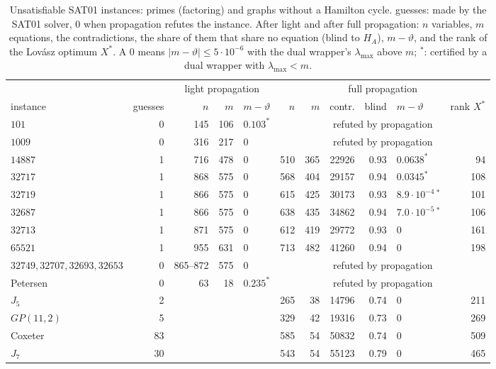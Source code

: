 \documentclass[11pt]{article}
\theoremstyle{definition}
\theoremstyle{remark}
\newcommand{\lmax}{\lambda_{\max}}
\begin{document}
\begin{table}[ht]
\begin{center}
\small
\setlength\tabcolsep{3pt}
\begin{tabular}{|l|r|r|r|l|r|r|r|r|l|r|}
\hline
 & & \multicolumn{3}{c|}{light propagation} & \multicolumn{6}{c|}{full propagation} \\
instance & guesses & $n$ & $m$ & $m-\vartheta$ & $n$ & $m$ & contr. & blind & $m-\vartheta$ & rank $X^*$ \\
\hline
$101$   & 0 & 145 & 106 & $0.103^*$ & \multicolumn{6}{c|}{refuted by propagation} \\
$1009$  & 0 & 316 & 217 & 0 & \multicolumn{6}{c|}{refuted by propagation} \\
$14887$ & 1 & 716 & 478 & 0 & 510 & 365 & 22926 & 0.93 & $0.0638^*$ & 94 \\
$32717$ & 1 & 868 & 575 & 0 & 568 & 404 & 29157 & 0.94 & $0.0345^*$ & 108 \\
$32719$ & 1 & 866 & 575 & 0 & 615 & 425 & 30173 & 0.93 & $8.9\cdot10^{-4}\,{}^*$ & 101 \\
$32687$ & 1 & 866 & 575 & 0 & 638 & 435 & 34862 & 0.94 & $7.0\cdot10^{-5}\,{}^*$ & 106 \\
$32713$ & 1 & 871 & 575 & 0 & 612 & 419 & 29772 & 0.93 & 0 & 161 \\
$65521$ & 1 & 955 & 631 & 0 & 713 & 482 & 41260 & 0.94 & 0 & 198 \\
$32749,32707,32693,32653$ & 0 & 865--872 & 575 & 0 & \multicolumn{6}{c|}{refuted by propagation} \\
\hline
Petersen   & 0  & 63 & 18 & $0.235^*$ & \multicolumn{6}{c|}{refuted by propagation} \\
$J_5$      & 2  &    &    &   & 265 & 38 & 14796 & 0.74 & 0 & 211 \\
$GP(11,2)$ & 5  &    &    &   & 329 & 42 & 19316 & 0.73 & 0 & 269 \\
Coxeter    & 83 &    &    &   & 585 & 54 & 50832 & 0.74 & 0 & 509 \\
$J_7$      & 30 &    &    &   & 543 & 54 & 55123 & 0.79 & 0 & 465 \\
\hline
\end{tabular}
\end{center}
\caption{\label{tab:sat01unsat} Unsatisfiable SAT01 instances: primes
(factoring) and graphs without a Hamilton cycle. guesses: made by the SAT01
solver, 0 when propagation refutes the instance. After light and after full
propagation: $n$ variables, $m$ equations, the contradictions, the share of
them that share no equation (blind to $H_A$), $m-\vartheta$, and the rank of
the Lov\'asz optimum $X^*$. A $0$ means $|m-\vartheta|\leq5\cdot10^{-6}$ with
the dual wrapper's $\lmax$ above $m$; $^*$: certified by a dual wrapper with
$\lmax<m$.}
\end{table}
\end{document}
